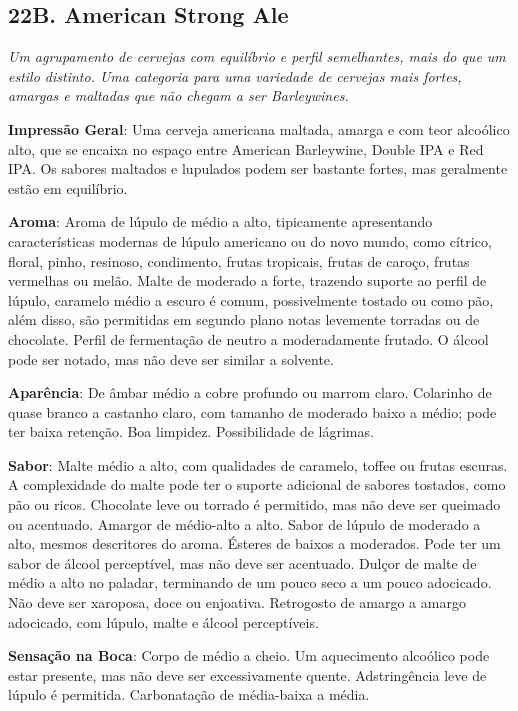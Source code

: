 \subsection*{22B. American Strong Ale}
\textit{Um agrupamento de cervejas com equilíbrio e perfil semelhantes, mais do que um estilo distinto. Uma categoria para uma variedade de cervejas mais fortes, amargas e maltadas que não chegam a ser Barleywines.}

\textbf{Impressão Geral}: Uma cerveja americana maltada, amarga e com teor alcoólico alto, que se encaixa no espaço entre American Barleywine, Double IPA e Red IPA. Os sabores maltados e lupulados podem ser bastante fortes, mas geralmente estão em equilíbrio.

\textbf{Aroma}: Aroma de lúpulo de médio a alto, tipicamente apresentando características modernas de lúpulo americano ou do novo mundo, como cítrico, floral, pinho, resinoso, condimento, frutas tropicais, frutas de caroço, frutas vermelhas ou melão. Malte de moderado a forte, trazendo suporte ao perfil de lúpulo, caramelo médio a escuro é comum, possivelmente tostado ou como pão, além disso, são permitidas em segundo plano notas levemente torradas ou de chocolate. Perfil de fermentação de neutro a moderadamente frutado. O álcool pode ser notado, mas não deve ser similar a solvente.

\textbf{Aparência}: De âmbar médio a cobre profundo ou marrom claro. Colarinho de quase branco a castanho claro, com tamanho de moderado baixo a médio; pode ter baixa retenção. Boa limpidez. Possibilidade de lágrimas.

\textbf{Sabor}: Malte médio a alto, com qualidades de caramelo, toffee ou frutas escuras. A complexidade do malte pode ter o suporte adicional de sabores tostados, como pão ou ricos. Chocolate leve ou torrado é permitido, mas não deve ser queimado ou acentuado. Amargor de médio-alto a alto. Sabor de lúpulo de moderado a alto, mesmos descritores do aroma. Ésteres de baixos a moderados. Pode ter um sabor de álcool perceptível, mas não deve ser acentuado. Dulçor de malte de médio a alto no paladar, terminando de um pouco seco a um pouco adocicado. Não deve ser xaroposa, doce ou enjoativa. Retrogosto de amargo a amargo adocicado, com lúpulo, malte e álcool perceptíveis.

\textbf{Sensação na Boca}: Corpo de médio a cheio. Um aquecimento alcoólico pode estar presente, mas não deve ser excessivamente quente. Adstringência leve de lúpulo é permitida. Carbonatação de média-baixa a média.

